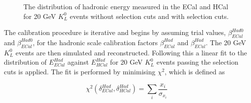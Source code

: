 \begin{figure}
\caption[The distribution of hadronic energy measured in the ECal and HCal for 20 GeV $K^{0}_{L}$ events with and without selection cuts.]{The distribution of hadronic energy measured in the ECal and HCal for 20 GeV $K^{0}_{L}$ events \protect{} without selection cuts and \protect{} with selection cuts.}
\label{fig:hadscaleselection}
\end{figure}

The calibration procedure is iterative and begins by assuming trial values, $\beta^{Had0}_{ECal}$ and $\beta^{Had0}_{ECal}$, for the hadronic scale calibration factors $\beta^{Had}_{ECal}$ and $\beta^{Had}_{ECal}$.  The 20 GeV $K^{0}_{L}$ events are then simulated and reconstructed.  Following this a linear fit to the distribution of $E^{Had}_{ECal}$ against $E^{Had}_{HCal}$ for 20 GeV $K^{0}_{L}$ events passing the selection cuts is applied.  The fit is performed by minimising $\chi^{2}$, which is defined as

\begin{equation}
\chi^{2}(\delta^{Had}_{ECal}, \delta^{Had}_{HCal}) = \sum_{i} \frac{x_{i}}{\sigma_{x_{i}}}
\end{equation}

